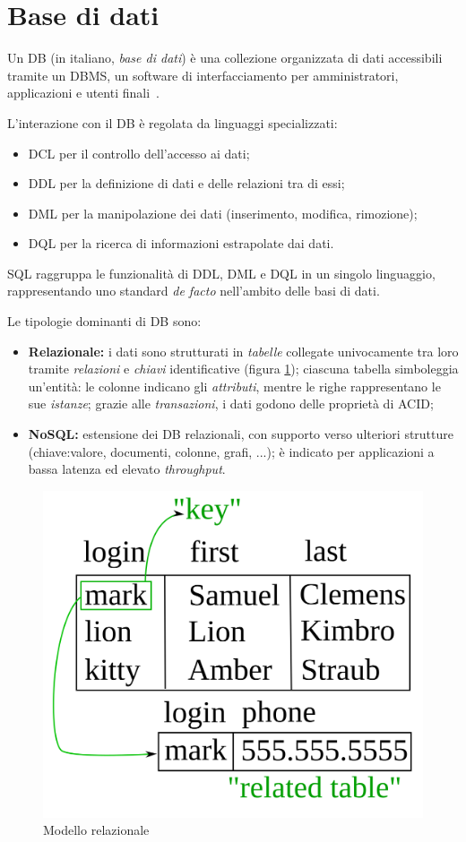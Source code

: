 \documentclass[12pt,a4paper,twoside,openright]{book}
\begin{document}
\section{Base di dati}
Un \acf{DB} (in italiano, \textit{base di dati}) è una collezione organizzata di dati accessibili tramite un \acf{DBMS}, un software di interfacciamento per amministratori, applicazioni e utenti finali~\cite{dbwiki}.

L'interazione con il \ac{DB} è regolata da linguaggi specializzati:
\begin{itemize}
    \item \acf{DCL} per il controllo dell'accesso ai dati;
    \item \acf{DDL} per la definizione di dati e delle relazioni tra di essi;
    \item \acf{DML} per la manipolazione dei dati (inserimento, modifica, rimozione);
    \item \acf{DQL} per la ricerca di informazioni estrapolate dai dati.
\end{itemize}
\acf{SQL} raggruppa le funzionalità di \ac{DDL}, \ac{DML} e \ac{DQL} in un singolo linguaggio, rappresentando uno standard \textit{de facto} nell'ambito delle basi di dati.

Le tipologie dominanti di \ac{DB} sono:
\begin{itemize}
    \item \textbf{Relazionale:} i dati sono strutturati in \textit{tabelle} collegate univocamente tra loro tramite \textit{relazioni} e \textit{chiavi} identificative (figura \ref{fig:relational-key}); ciascuna tabella simboleggia un'entità: le colonne indicano gli \textit{attributi}, mentre le righe rappresentano le sue \textit{istanze}; grazie alle \textit{transazioni}, i dati godono delle proprietà di \acf{ACID};
    \item \textbf{\acf{NoSQL}:} estensione dei \ac{DB} relazionali, con supporto verso ulteriori strutture (chiave:valore, documenti, colonne, grafi, ...); è indicato per applicazioni a bassa latenza ed elevato \textit{throughput}.
\end{itemize}
\begin{figure}[ht]
    \centering
    \includegraphics[width=0.35\linewidth]{images/relational_key.png}
    \caption{Modello relazionale~\cite{dbwiki}}
    \label{fig:relational-key}
\end{figure}
\end{document}
